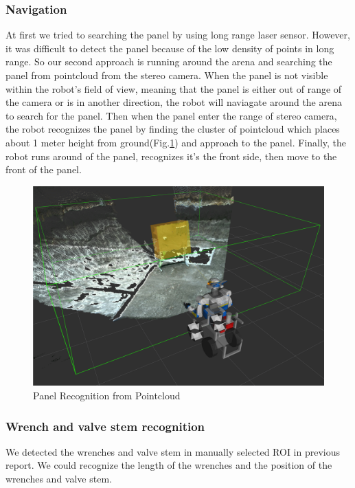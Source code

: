 \subsubsection{Navigation}
At first we tried to searching the panel by using long range laser sensor.
However, it was difficult to detect the panel because of the low density of points in long range.
So our second approach is running around the arena and searching the panel from pointcloud from the stereo camera.
When the panel is not visible within the robot's field of view, meaning that the panel is either out of range of the camera or is in another direction, the robot will naviagate around the arena to search for the panel.
Then when the panel enter the range of stereo camera, the robot recognizes the panel by finding
the cluster of pointcloud which places about 1 meter height from ground(Fig.\ref{fig: task2_panel-recognition}) and approach to the panel.
Finally, the robot runs around of the panel, recognizes it's the front side, then move to the front of the panel.

\begin{figure}[htb]
  \begin{center}
    \includegraphics[width=0.80\columnwidth]{sections/task2/images/panel_detect.png}
    \caption{Panel Recognition from Pointcloud}
    \label{fig: task2_panel-recognition}
  \end{center}
\end{figure}

\subsubsection{Wrench and valve stem recognition}
We detected the wrenches and valve stem in manually selected ROI in previous report. We could recognize
the length of the wrenches and the position of the wrenches and valve stem.

